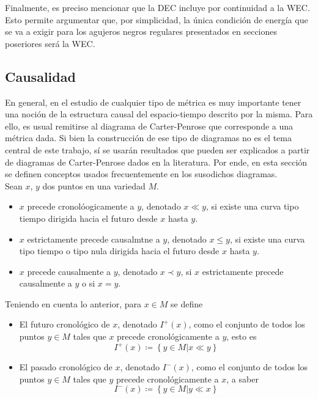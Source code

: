 \documentclass[16pt,a4paper]{article}
\numberwithin{equation}{section}
\theoremstyle{definition}
\begin{document}
Finalmente, es preciso mencionar que la DEC incluye por continuidad a la WEC. Esto permite argumentar que, por simplicidad, la única condición de energía que se va a exigir para los agujeros negros regulares presentados en secciones poseriores será la WEC.\\


\subsection{Causalidad} 

En general, en el estudio de cualquier tipo de métrica es muy importante tener una noción de la estructura causal del espacio-tiempo descrito por la misma. Para ello, es usual remitirse al diagrama de Carter-Penrose que corresponde a una métrica dada. Si bien la construcción de ese tipo de diagramas no es el tema central de este trabajo, sí se usarán resultados que pueden ser explicados a partir de diagramas de Carter-Penrose dados en la literatura. Por ende, en esta sección se definen conceptos usados frecuentemente en los susodichos diagramas.\\

Sean $x$, $y$ dos puntos en una variedad $M$.
\begin{itemize}
	\item $x$ precede cronolóogicamente a $y$, denotado $x \ll y$, si existe una curva tipo tiempo dirigida hacia el futuro desde $x$ hasta $y$.
	
	\item $x$ estrictamente precede causalmtne a $y$, denotado $x \leq y$, si existe una curva tipo tiempo o tipo nula dirigida hacia el futuro desde $x$ hasta $y$.
	
	\item $x$ precede causalmente a $y$, denotado $x \prec y$, si $x$ estrictamente precede causalmente a $y$ o si $x = y$.
\end{itemize}

Teniendo en cuenta lo anterior, para $x \in M$ se define
\begin{itemize}
	\item El futuro cronológico de $x$, denotado $I^+(x)$, como el conjunto de todos los puntos $y \in M$ tales que $x$ precede cronológicamente a $y$, esto es
	\begin{equation*}
	I^+(x) \coloneqq \left\lbrace y \in M | x \ll y \right\rbrace
	\end{equation*}
	\item El pasado cronológico de $x$, denotado $I^-(x)$, como el conjunto de todos los puntos $y \in M$ tales que $y$ precede cronológicamente a $x$, a saber
	\begin{equation*}
	I^-(x) \coloneqq \left\lbrace y \in M | y \ll x \right\rbrace
	\end{equation*}
\end{itemize}
\end{document}
